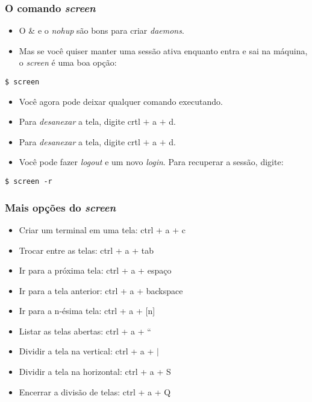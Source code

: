 \documentclass{beamer}
\begin{document}
   \begin{frame}[fragile]
      \frametitle{O comando \textit{screen}}
      \begin{itemize}
         \item O \& e o \textit{nohup} são bons para criar \textit{daemons}.
         \item Mas se você quiser manter uma sessão ativa enquanto entra e sai na máquina, o \textit{screen} é uma boa opção:
      \end{itemize}
      \begin{verbatim}
$ screen
      \end{verbatim}        
      \begin{itemize}
         \item Você agora pode deixar qualquer comando executando. 
         \item Para \textit{desanexar} a tela, digite crtl $+$ a $+$ d.
         \item Para \textit{desanexar} a tela, digite crtl $+$ a $+$ d.
         \item Você pode fazer \textit{logout} e um novo \textit{login}. Para recuperar a sessão, digite: 
      \end{itemize}      
      \begin{verbatim}
$ screen -r
      \end{verbatim} 
\end{frame}

   \begin{frame}
      \frametitle{Mais opções do \textit{screen}}
      \begin{itemize}
         \item Criar um terminal em uma tela: ctrl + a + c 
         \item Trocar entre as telas: ctrl + a + tab 
         \item Ir para a próxima tela: ctrl + a + espaço 
         \item Ir para a tela anterior: ctrl + a + backspace 
         \item Ir para a n-ésima tela: ctrl + a + [n] 
         \item Listar as telas abertas: ctrl + a + \textquotedblleft 
         \item Dividir a tela na vertical: ctrl + a + $|$ 
         \item Dividir a tela na horizontal: ctrl + a + S 
         \item Encerrar a divisão de telas: ctrl + a + Q 
      \end{itemize}
   \end{frame}
\end{document}
